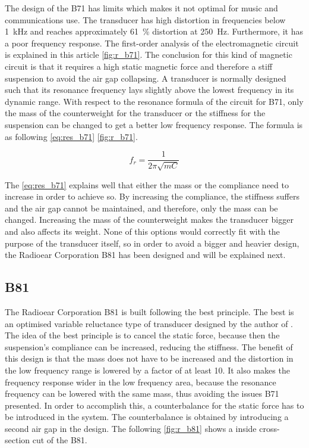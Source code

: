 The design of the B71 has limits which makes it not optimal for music and communications use. The transducer has high distortion in frequencies below \SI{1}{\kilo\hertz} and reaches approximately \SI{61}{\percent} distortion at \SI{250}{\hertz}. Furthermore, it has a poor frequency response. The first-order analysis of the electromagnetic circuit is explained in this article \autoref{fig:r_b71}. The conclusion for this kind of magnetic circuit is that it requires a high static magnetic force and therefore a stiff suspension to avoid the air gap collapsing. A transducer is normally designed such that its resonance frequency lays slightly above the lowest frequency in its dynamic range. With respect to the resonance formula of the circuit for B71, only the mass of the counterweight for the transducer or the stiffness for the suspension can be changed to get a better low frequency response. The formula is as following \autoref{eq:res_b71} \autoref{fig:r_b71}.

\begin{equation}\label{eq:res_b71}
f_r=\frac{1}{2 \pi \sqrt{m C}}
\end{equation}

    \startexplain
    \stopexplain

The \autoref{eq:res_b71} explains well that either the mass or the compliance need to increase in order to achieve so. By increasing the compliance, the stiffness suffers and the air gap cannot be maintained, and therefore, only the mass can be changed. Increasing the mass of the counterweight makes the transducer bigger and also affects its weight. None of this options would correctly fit with the purpose of the transducer itself, so in order to avoid a bigger and heavier design, the Radioear Corporation B81 has been designed and will be explained next. 


\subsection{B81}
The Radioear Corporation B81 is built following the \gls{best} principle. The \gls{best} is an optimised variable reluctance type of transducer designed by the author of \citep{the_balanced_2003}. The idea of the \gls{best} principle is to cancel the static force, because then the suspension's compliance can be increased, reducing the stiffness. The benefit of this design is that the mass does not have to be increased and the distortion in the low frequency range is lowered by a factor of at least 10. It also makes the frequency response wider in the low frequency area, because the resonance frequency can be lowered with the same mass, thus avoiding the issues B71 presented. In order to accomplish this, a counterbalance for the static force has to be introduced in the system. The counterbalance is obtained by introducing a second air gap in the design. The following \autoref{fig:r_b81} shows a inside cross-section cut of the B81.

